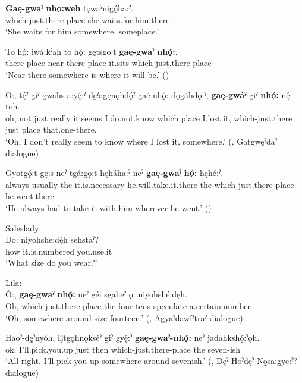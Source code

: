 \ea
\label{ex:gpart7}
\gll \textbf{Gaę-gwaˀ} \textbf{nhǫ:weh} tǫwaˀnigǫ́ha:ˀ.\\
which-just.there place she.waits.for.him.there\\
\glt ‘She waits for him somewhere, someplace.’
\z

\ea
\label{ex:gpart8}
\gll To hǫ́: iwá:kˀah to hǫ́: gętsgo:t \textbf{gaę-gwa}ˀ \textbf{nhǫ́:}.\\
there place near there place it.sits which-just.there place\\
\glt ‘Near there somewhere is where it will be.’ (\cite{mithun_how_1980})
\z


\ea
\label{ex:gpart9}
\gll O:, tę́ˀ giˀ gwahs a:yę́:ˀ de̱ˀagęnǫhdǫ́ˀ gaé nhǫ́: dǫgáhdǫ:ˀ, \textbf{gaę-gwáˀ} giˀ \textbf{nhǫ́:} nę́:-toh.\\
oh, not just really it.seems I.do.not.know which place I.lost.it, which-just.there just place that.one-there.\\
\glt ‘Oh, I don’t really seem to know where I lost it, somewhere.’ (\cite[184]{mithun_watewayestanih_1984}, Gatgwęˀdaˀ dialogue)
\z

\ea
\label{ex:gpart11}
\gll Gyotgǫ́:t gę:s neˀ tgá:gǫ:t hęháha:ˀ neˀ \textbf{gaę-gwaˀ} \textbf{hǫ́:} hęhé:ˀ.\\
always usually the it.is.necessary he.will.take.it.there the which-just.there place he.went.there\\
\glt ‘He always had to take it with him wherever he went.’ (\cite{henry_de_2005})
\z

\ea
\label{ex:gpart12} Saleslady: \\
\gll Do: niyohshe:dę́h se̱hstaˀ?\\ 
{} how it.is.numbered you.use.it \\
\glt ‘What size do you wear?’ 

Lila: \\
\gll Ó:, \textbf{gaę-gwaˀ} \textbf{nhǫ́:} neˀ géi sga̱heˀ ǫ: niyohshé:dęh. \\
Oh, which-just.there place the four tens speculate a.certain.number \\
\glt `Oh, somewhere around size fourteen.’ (\cite[225]{mithun_watewayestanih_1984}, Agyaˀdawíˀtraˀ dialogue)
\z


\ea
\label{ex:gpart13}
\gll Haoˀ-dę̱ˀnyóh. Ętgǫhnǫkséˀ giˀ gyę́:ˀ \textbf{gaę-gwaˀ-nhǫ́:} neˀ jadahkshǫ́:ˀǫh.\\
ok. I’ll.pick.you.up just then which-just.there-place the seven-ish\\
\glt ‘All right. I’ll pick you up somewhere around sevenish.’ (\cite[349]{mithun_watewayestanih_1984}, Dęˀ Hoˀdęˀ Nǫ̱sa:gye:ˀ? dialogue)
\z

